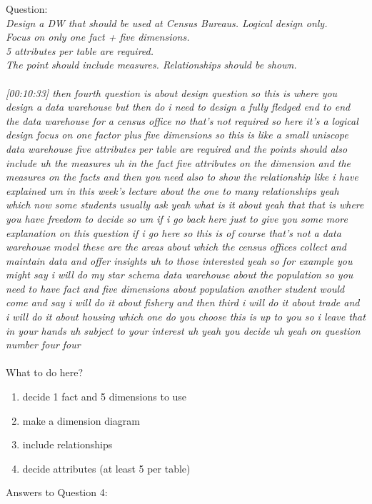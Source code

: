 Question:\\
\emph{
    Design a DW that should be used at Census Bureaus. Logical design only.\\ Focus on only
one fact + five dimensions.\\ 5 attributes per table are required.\\ The point should include
measures. Relationships should be shown.
}\\\\
\emph{[00:10:33] then fourth question is about design question so this is where you design a data warehouse but then do i need to design a fully
fledged end to end the data warehouse for a census office no that's not required so here it's a logical
design focus on one factor plus five dimensions so this is like a small uniscope data warehouse five
attributes per table are required and the points should also include uh the measures uh in the fact
five attributes on the dimension and the measures on the facts and then you need also to show the
relationship like i have explained um in this week's lecture about the one to many relationships
yeah which now some students usually ask yeah what is it about yeah that that is where you have freedom
to decide so um if i go back here just to give you some more explanation on this question if i go here
so this is of course that's not a data warehouse model these are the areas about which the census offices
collect and maintain data and offer insights uh to those interested yeah so for example you might
say i will do my star schema data warehouse about the population so you need to have
fact and five dimensions about population another student would come and say i will do it about fishery and
then third i will do it about trade and i will do it about housing which one do you choose this is up to you
so i leave that in your hands uh subject to your interest uh yeah you decide uh yeah on question number four
four}\\\\
What to do here?
\begin{enumerate}
    \item decide 1 fact and 5 dimensions to use
    \item make a dimension diagram
    \item include relationships
    \item decide attributes (at least 5 per table)
  \end{enumerate}

\newpage Answers to Question 4:
